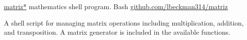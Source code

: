 \showoff
{\href{https://liambeckman.com/code/matriz}{matriz*}}
{mathematics shell program.}
{Bash}
{\href{https://github.com/lbeckman314/matriz}{github.com/lbeckman314/matriz}}

A shell script for managing matrix operations including multiplication, addition, and transposition. A matrix generator is included in the available functions.

\myBreak
